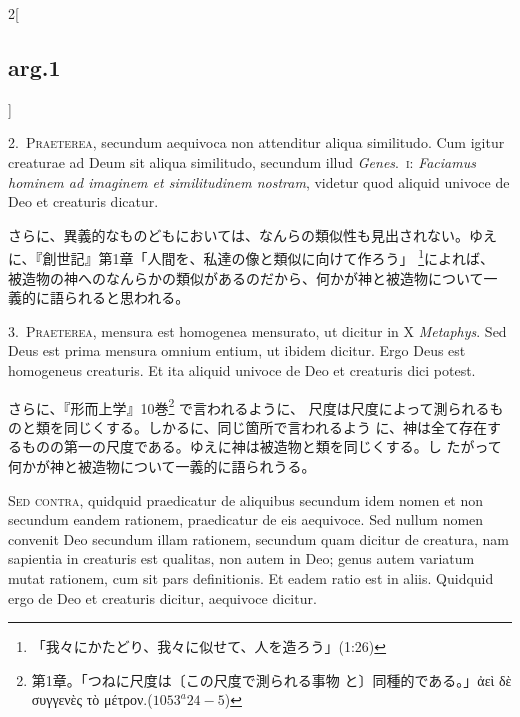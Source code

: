\documentclass[paper=a4paper,fontsize=10pt,jafontsize=9pt,titlepage]{jlreq}
\begin{document}
\begin{paracol}{2}[\subsection{arg.1}]

2.~{\scshape Praeterea}, secundum aequivoca non attenditur aliqua
similitudo. Cum igitur creaturae ad Deum sit aliqua similitudo,
secundum illud {\itshape Genes}.\ {\scshape i}: {\itshape Faciamus hominem ad
imaginem et similitudinem nostram}, videtur quod aliquid univoce de
Deo et creaturis dicatur.

\switchcolumn

さらに、異義的なものどもにおいては、なんらの類似性も見出されない。ゆえ
に、『創世記』第1章「人間を、私達の像と類似に向けて作ろう」
\footnote{「我々にかたどり、我々に似せて、人を造ろう」(1:26)}によれば、
被造物の神へのなんらかの類似があるのだから、何かが神と被造物について一
義的に語られると思われる。


3.~{\scshape Praeterea}, mensura est homogenea mensurato, ut dicitur in X
{\itshape Metaphys}. Sed Deus est prima mensura omnium entium, ut ibidem
dicitur. Ergo Deus est homogeneus creaturis. Et ita aliquid univoce de
Deo et creaturis dici potest.

\switchcolumn

さらに、『形而上学』10巻\footnote{第1章。「つねに尺度は〔この尺度で測られる事物
と〕同種的である。」ἀεὶ δὲ συγγενὲς τὸ μέτρον.($1053^{a}24-5$)} で言われるように、
尺度は尺度によって測られるものと類を同じくする。しかるに、同じ箇所で言われるよう
に、神は全て存在するものの第一の尺度である。ゆえに神は被造物と類を同じくする。し
たがって何かが神と被造物について一義的に語られうる。

\switchcolumn*[\subsection{s.c.}]

{\scshape Sed contra}, quidquid praedicatur de aliquibus secundum idem
nomen et non secundum eandem rationem, praedicatur de eis
aequivoce. Sed nullum nomen convenit Deo secundum illam rationem,
secundum quam dicitur de creatura, nam sapientia in creaturis est
qualitas, non autem in Deo; genus autem variatum mutat rationem, cum
sit pars definitionis. Et eadem ratio est in aliis. Quidquid ergo de
Deo et creaturis dicitur, aequivoce dicitur.


\end{paracol}
\end{document}
